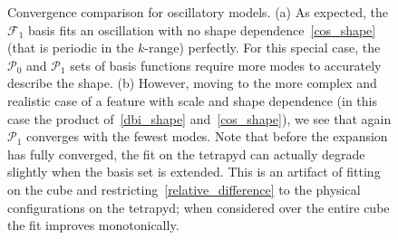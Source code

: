 \documentclass[a4paper,12pt]{extarticle}
\newcommand{\Lbasic}{\mathcal{P}_0}
\newcommand{\Linvk}{\mathcal{P}_1}
\newcommand{\Finvk}{\mathcal{F}_1}
\begin{document}
\begin{figure}[!pth]
\centering     %
{}
\caption{
    Convergence comparison for oscillatory models. (a) As expected, the $\Finvk$ basis fits an oscillation with
    no shape dependence~\eqref{cos_shape} (that is periodic in the $k$-range) perfectly.
    For this special case, the $\Lbasic$ and $\Linvk$ sets of basis functions require more modes
    to accurately describe the shape. (b) However, moving to the more complex and realistic case of a
    feature with scale and shape dependence (in this case the product of~\eqref{dbi_shape}
    and~\eqref{cos_shape}), we see that again $\Linvk$ converges with the fewest modes.
    Note that before the expansion has fully converged, the fit on the tetrapyd
    can actually degrade slightly when the basis set is extended. This is an artifact
    of fitting on the cube and restricting~\eqref{relative_difference}
    to the physical configurations on the tetrapyd; when considered over the
    entire cube the fit improves monotonically.
}\label{fig:recon_osc_dbiosc}
\end{figure}
\end{document}

